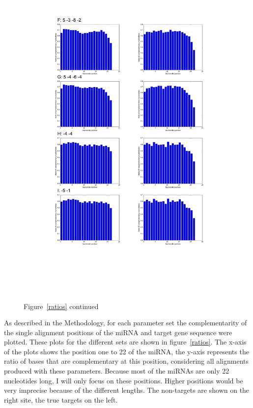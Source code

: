 \documentclass[11pt, a4paper, twoside]{book}
\begin{document}
\begin{figure}
\hspace{-1.2cm}
\includegraphics[scale=0.72]{results/compl2.pdf}
\vspace{-4cm}
\caption*{Figure~\ref{ratios} continued}
\end{figure}


As described in the Methodology, for each parameter set the complementarity of the single alignment positions of the miRNA and target gene sequence were plotted. These plots for the different sets are shown in figure~\ref{ratios}. The x-axis of the plots shows the position one to 22 of the miRNA, the y-axis represents the ratio of bases that are complementary at this position, considering all alignments produced with these parameters. Because most of the miRNAs are only 22 nucleotides long, I will only focus on these positions. Higher positions would be very imprecise because of the different lengths. The non-targets are shown on the right site, the true targets on the left.\\\\
\end{document}

